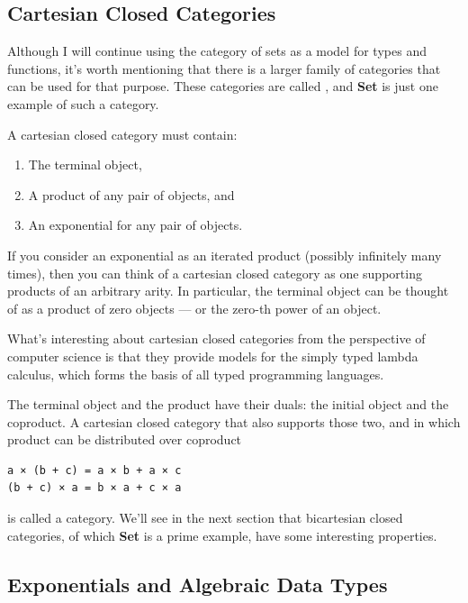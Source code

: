 \subsection{Cartesian Closed
Categories}\label{cartesian-closed-categories}

Although I will continue using the category of sets as a model for types
and functions, it's worth mentioning that there is a larger family of
categories that can be used for that purpose. These categories are
called , and \textbf{Set} is just one example of
such a category.

A cartesian closed category must contain:

\begin{enumerate}
\tightlist
\item
  The terminal object,
\item
  A product of any pair of objects, and
\item
  An exponential for any pair of objects.
\end{enumerate}

If you consider an exponential as an iterated product (possibly
infinitely many times), then you can think of a cartesian closed
category as one supporting products of an arbitrary arity. In
particular, the terminal object can be thought of as a product of zero
objects --- or the zero-th power of an object.

What's interesting about cartesian closed categories from the
perspective of computer science is that they provide models for the
simply typed lambda calculus, which forms the basis of all typed
programming languages.

The terminal object and the product have their duals: the initial object
and the coproduct. A cartesian closed category that also supports those
two, and in which product can be distributed over coproduct

\begin{verbatim}
a × (b + c) = a × b + a × c
(b + c) × a = b × a + c × a
\end{verbatim}

is called a  category. We'll see in the next
section that bicartesian closed categories, of which \textbf{Set} is a
prime example, have some interesting properties.

\subsection{Exponentials and Algebraic Data
Types}\label{exponentials-and-algebraic-data-types}

